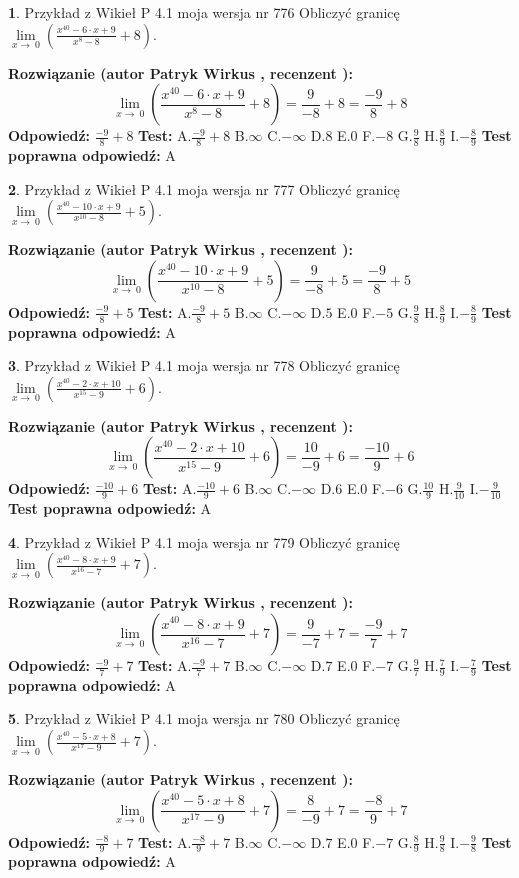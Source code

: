 \documentclass[12pt, a4paper]{article}
\theoremstyle{definition} %
\newtheorem{zad}{}
\newcommand{\zadStart}[1]{\begin{zad}#1\newline}
\newcommand{\zadStop}{\end{zad}}
\newcommand{\rozwStart}[2]{\noindent \textbf{Rozwiązanie (autor #1 , recenzent #2): }\newline}
\newcommand{\rozwStop}{\newline}
\newcommand{\odpStart}{\noindent \textbf{Odpowiedź:}\newline}
\newcommand{\odpStop}{\newline}
\newcommand{\testStart}{\noindent \textbf{Test:}\newline}
\newcommand{\testStop}{\newline}
\newcommand{\kluczStart}{\noindent \textbf{Test poprawna odpowiedź:}\newline}
\newcommand{\kluczStop}{\newline}
\begin{document}
\zadStart{Przykład z Wikieł P 4.1 moja wersja nr 776}
Obliczyć granicę $\lim\limits_{x\to\ 0}(\frac{x^{40}-6 \cdot x +9}{x^{8}-8}+8)$.
\zadStop
\rozwStart{Patryk Wirkus}{}
$$\lim\limits_{x\to\ 0}(\frac{x^{40}-6 \cdot x +9}{x^{8}-8}+8)=\frac{9}{-8}+8=\frac{-9}{8}+8$$
\rozwStop
\odpStart
$\frac{-9}{8}+8$
\odpStop
\testStart
A.$\frac{-9}{8}+8$
B.$\infty$
C.$-\infty$
D.$8$
E.$0$
F.$-8$
G.$\frac{9}{8}$
H.$\frac{8}{9}$
I.$-\frac{8}{9}$
\testStop
\kluczStart
A
\kluczStop



\zadStart{Przykład z Wikieł P 4.1 moja wersja nr 777}
Obliczyć granicę $\lim\limits_{x\to\ 0}(\frac{x^{40}-10 \cdot x +9}{x^{10}-8}+5)$.
\zadStop
\rozwStart{Patryk Wirkus}{}
$$\lim\limits_{x\to\ 0}(\frac{x^{40}-10 \cdot x +9}{x^{10}-8}+5)=\frac{9}{-8}+5=\frac{-9}{8}+5$$
\rozwStop
\odpStart
$\frac{-9}{8}+5$
\odpStop
\testStart
A.$\frac{-9}{8}+5$
B.$\infty$
C.$-\infty$
D.$5$
E.$0$
F.$-5$
G.$\frac{9}{8}$
H.$\frac{8}{9}$
I.$-\frac{8}{9}$
\testStop
\kluczStart
A
\kluczStop



\zadStart{Przykład z Wikieł P 4.1 moja wersja nr 778}
Obliczyć granicę $\lim\limits_{x\to\ 0}(\frac{x^{40}-2 \cdot x +10}{x^{15}-9}+6)$.
\zadStop
\rozwStart{Patryk Wirkus}{}
$$\lim\limits_{x\to\ 0}(\frac{x^{40}-2 \cdot x +10}{x^{15}-9}+6)=\frac{10}{-9}+6=\frac{-10}{9}+6$$
\rozwStop
\odpStart
$\frac{-10}{9}+6$
\odpStop
\testStart
A.$\frac{-10}{9}+6$
B.$\infty$
C.$-\infty$
D.$6$
E.$0$
F.$-6$
G.$\frac{10}{9}$
H.$\frac{9}{10}$
I.$-\frac{9}{10}$
\testStop
\kluczStart
A
\kluczStop



\zadStart{Przykład z Wikieł P 4.1 moja wersja nr 779}
Obliczyć granicę $\lim\limits_{x\to\ 0}(\frac{x^{40}-8 \cdot x +9}{x^{16}-7}+7)$.
\zadStop
\rozwStart{Patryk Wirkus}{}
$$\lim\limits_{x\to\ 0}(\frac{x^{40}-8 \cdot x +9}{x^{16}-7}+7)=\frac{9}{-7}+7=\frac{-9}{7}+7$$
\rozwStop
\odpStart
$\frac{-9}{7}+7$
\odpStop
\testStart
A.$\frac{-9}{7}+7$
B.$\infty$
C.$-\infty$
D.$7$
E.$0$
F.$-7$
G.$\frac{9}{7}$
H.$\frac{7}{9}$
I.$-\frac{7}{9}$
\testStop
\kluczStart
A
\kluczStop



\zadStart{Przykład z Wikieł P 4.1 moja wersja nr 780}
Obliczyć granicę $\lim\limits_{x\to\ 0}(\frac{x^{40}-5 \cdot x +8}{x^{17}-9}+7)$.
\zadStop
\rozwStart{Patryk Wirkus}{}
$$\lim\limits_{x\to\ 0}(\frac{x^{40}-5 \cdot x +8}{x^{17}-9}+7)=\frac{8}{-9}+7=\frac{-8}{9}+7$$
\rozwStop
\odpStart
$\frac{-8}{9}+7$
\odpStop
\testStart
A.$\frac{-8}{9}+7$
B.$\infty$
C.$-\infty$
D.$7$
E.$0$
F.$-7$
G.$\frac{8}{9}$
H.$\frac{9}{8}$
I.$-\frac{9}{8}$
\testStop
\kluczStart
A
\kluczStop
\end{document}
